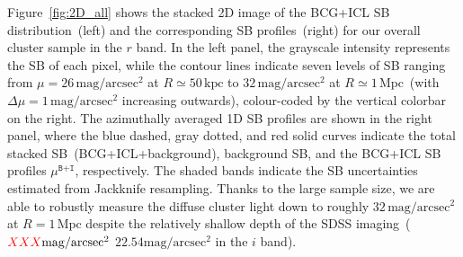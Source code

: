 \documentclass[fleqn,usenatbib]{mnras}
\newcommand{\mubi}{\mu^{\texttt{B+I}}}
\newcommand{\sbmag}{\mathrm{mag}/\mathrm{arcsec}^{2}}
\newcommand{\mpc}{\mathrm{Mpc}}
\newcommand{\kpc}{\mathrm{kpc}}
\newcommand*\xxx{{\color{red}XXX}}
\newcommand\xkchen[1]{{\color{cyan} {#1}}}
\begin{document}
Figure~\ref{fig:2D_all} shows the stacked 2D image of the BCG+ICL SB
distribution~(left) and the corresponding SB profiles~(right) for our
overall cluster sample in the $r$ band. In the left panel, the grayscale
intensity represents the SB of each pixel, while the contour lines indicate
seven levels of SB ranging from $\mu=26\,\sbmag$ at $R{\simeq}50\,\kpc$ to
$32\,\sbmag$ at $R{\simeq}1\,\mpc$~(with $\Delta \mu=1\,\sbmag$ increasing
outwards), colour-coded by the vertical colorbar on the right. The
azimuthally averaged 1D SB profiles are shown in the right panel, where the
blue dashed, gray dotted, and red solid curves indicate the total stacked
SB~(BCG+ICL+background), background SB, and the BCG+ICL SB profiles
$\mubi$, respectively. The shaded bands indicate the SB uncertainties
estimated from Jackknife resampling. Thanks to the large sample size, we
are able to robustly measure the diffuse cluster light down to roughly
$32\,\sbmag$ at $R{=}1\,\mpc$ despite the relatively shallow depth of the
SDSS imaging~($\xxx\sbmag$\xkchen{$22.54\sbmag$ in the $i$ band}).
\end{document}
